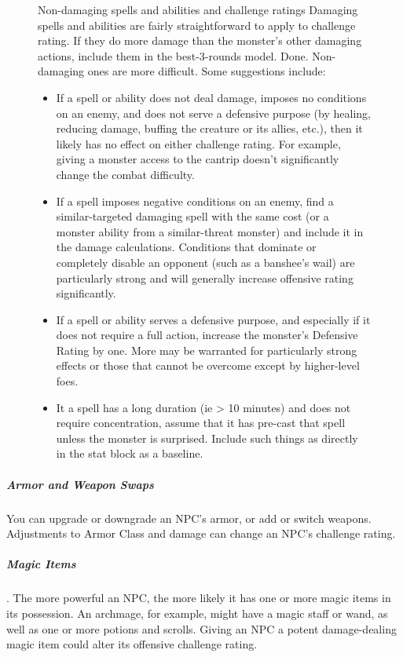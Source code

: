 \begin{figure}
	\begin{DndComment}{Non-damaging spells and abilities and challenge ratings}
		Damaging spells and abilities are fairly straightforward to apply to challenge rating. If they do more damage than the monster's other damaging actions, include them in the best-3-rounds model. Done. Non-damaging ones are more difficult. Some suggestions include:
		\begin{itemize}
			\item If a spell or ability does not deal damage, imposes no conditions on an enemy, and does not serve a defensive purpose (by healing, reducing damage, buffing the creature or its allies, etc.), then it likely has no effect on either challenge rating. For example, giving a monster access to the  cantrip doesn't significantly change the combat difficulty.
			\item If a spell imposes negative conditions on an enemy, find a similar-targeted damaging spell with the same cost (or a monster ability from a similar-threat monster) and include it in the damage calculations. Conditions that dominate or completely disable an opponent (such as a banshee's wail) are particularly strong and will generally increase offensive rating significantly.
			\item If a spell or ability serves a defensive purpose, and especially if it does not require a full action, increase the monster's Defensive Rating by one. More may be warranted for particularly strong effects or those that cannot be overcome except by higher-level foes.
			\item It a spell has a long duration (ie > 10 minutes) and does not require concentration, assume that it has pre-cast that spell unless the monster is surprised. Include such things as  directly in the stat block as a baseline.
        \end{itemize}
	\end{DndComment}
\end{figure}

\subparagraph*{Armor and Weapon Swaps} You can upgrade or downgrade an NPC's armor, or add or switch weapons. Adjustments to Armor Class and damage can change an NPC's challenge rating.

\subparagraph*{Magic Items}. The more powerful an NPC, the more likely it has one or more magic items in its possession. An archmage, for example, might have a magic staff or wand, as well as one or more potions and scrolls. Giving an NPC a potent damage-dealing magic item could alter its offensive challenge rating.

